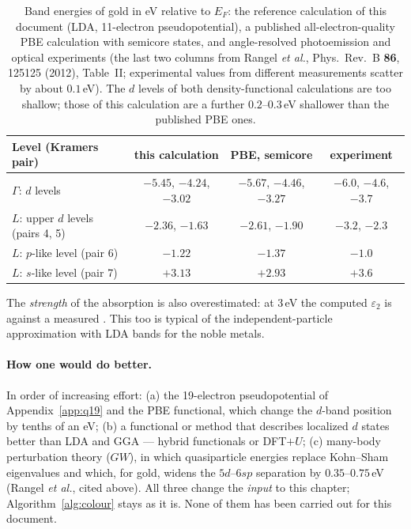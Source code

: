 \begin{table}[H]
\centering\small
\begin{tabular}{@{}lccc@{}}
\toprule
Level (Kramers pair) & this calculation & PBE, semicore & experiment\\
\midrule
$\Gamma$: $d$ levels & $-5.45$, $-4.24$, $-3.02$ & $-5.67$, $-4.46$, $-3.27$ & $-6.0$, $-4.6$, $-3.7$\\
$L$: upper $d$ levels (pairs 4, 5) & $-2.36$, $-1.63$ & $-2.61$, $-1.90$ & $-3.2$, $-2.3$\\
$L$: $p$-like level (pair 6) & $-1.22$ & $-1.37$ & $-1.0$\\
$L$: $s$-like level (pair 7) & $+3.13$ & $+2.93$ & $+3.6$\\
\bottomrule
\end{tabular}
\caption{Band energies of gold in eV relative to $E_F$: the reference
calculation of this document (LDA, 11-electron pseudopotential), a
published all-electron-quality PBE calculation with semicore states, and
angle-resolved photoemission and optical experiments (the last two columns
from Rangel \emph{et al.}, Phys.\ Rev.\ B \textbf{86}, 125125 (2012),
Table~II; experimental values from different measurements scatter by
about $0.1$\,eV). The $d$ levels of both density-functional calculations
are too shallow; those of this calculation are a further
$0.2$--$0.3$\,eV shallower than the published PBE ones.}
\label{tab:dbandexp}
\end{table}

The \emph{strength} of the absorption is also overestimated: at 3\,eV the
computed $\varepsilon_2$ is \EPSCALC{} against a measured \EPSEXP. This
too is typical of the independent-particle approximation with LDA bands
for the noble metals.

\paragraph{How one would do better.} In order of increasing effort:
(a) the 19-electron pseudopotential of Appendix~\ref{app:q19} and the PBE
functional, which change the $d$-band position by tenths of an eV;
(b) a functional or method that describes localized $d$ states better
than LDA and GGA --- hybrid functionals or DFT$+U$; (c) many-body
perturbation theory ($GW$), in which quasiparticle energies replace
Kohn--Sham eigenvalues and which, for gold, widens the $5d$--$6sp$
separation by $0.35$--$0.75$\,eV (Rangel \emph{et al.}, cited above). All three change the
\emph{input} to this chapter; Algorithm~\ref{alg:colour} stays as it is.
None of them has been carried out for this document.

